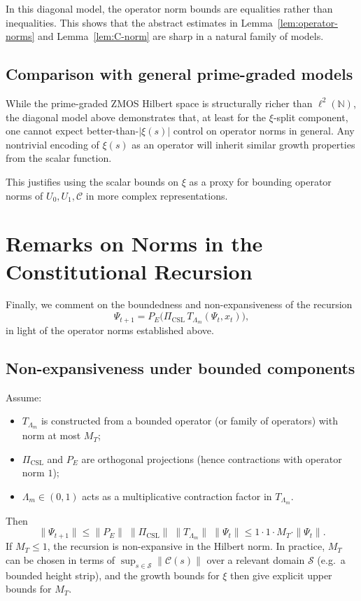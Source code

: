 \documentclass[11pt]{article}
\begin{document}
In this diagonal model, the operator norm bounds are equalities rather than inequalities.  This shows that the abstract estimates in Lemma~\ref{lem:operator-norms} and Lemma~\ref{lem:C-norm} are sharp in a natural family of models.

\subsection{Comparison with general prime-graded models}

While the prime-graded ZMOS Hilbert space is structurally richer than $\ell^2(\mathbb{N})$, the diagonal model above demonstrates that, at least for the $\xi$-split component, one cannot expect better-than-$|\xi(s)|$ control on operator norms in general.  Any nontrivial encoding of $\xi(s)$ as an operator will inherit similar growth properties from the scalar function.

This justifies using the scalar bounds on $\xi$ as a proxy for bounding operator norms of $U_0,U_1,\mathcal{C}$ in more complex representations.

\section{Remarks on Norms in the Constitutional Recursion}

Finally, we comment on the boundedness and non-expansiveness of the recursion
\[
  \Psi_{t+1} = P_E\bigl( \Pi_{\mathrm{CSL}}\,T_{\Lambda_m}(\Psi_t,x_t)\bigr),
\]
in light of the operator norms established above.

\subsection{Non-expansiveness under bounded components}

Assume:
\begin{itemize}
  \item $T_{\Lambda_m}$ is constructed from a bounded operator (or family of operators) with norm at most $M_T$;
  \item $\Pi_{\mathrm{CSL}}$ and $P_E$ are orthogonal projections (hence contractions with operator norm $1$);
  \item $\Lambda_m\in(0,1)$ acts as a multiplicative contraction factor in $T_{\Lambda_m}$.
\end{itemize}
Then
\begin{equation}
  \|\Psi_{t+1}\|
  \le \|P_E\|\;\|\Pi_{\mathrm{CSL}}\|\;\|T_{\Lambda_m}\|\;\|\Psi_t\|
  \le 1\cdot 1\cdot M_T \cdot \|\Psi_t\|.
\end{equation}
If $M_T\le 1$, the recursion is non-expansive in the Hilbert norm.  In practice, $M_T$ can be chosen in terms of $\sup_{s\in\mathcal{S}}\|\mathcal{C}(s)\|$ over a relevant domain $\mathcal{S}$ (e.g.\ a bounded height strip), and the growth bounds for $\xi$ then give explicit upper bounds for $M_T$.
\end{document}
